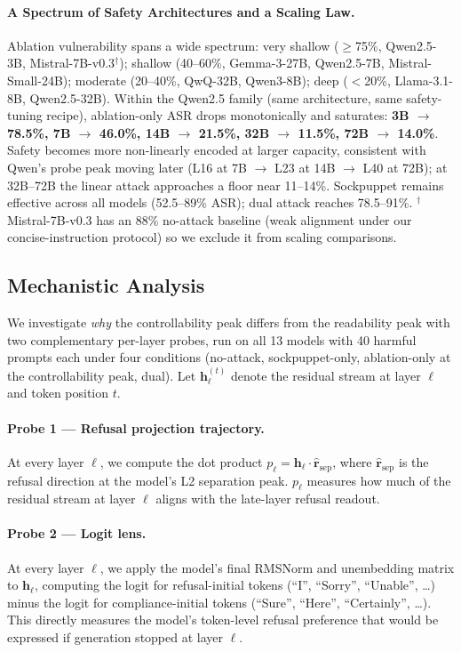 \documentclass{article}
\begin{document}
\paragraph{A Spectrum of Safety Architectures and a Scaling Law.}
Ablation vulnerability spans a wide spectrum: very shallow ($\geq$75\%, Qwen2.5-3B, Mistral-7B-v0.3$^\dagger$); shallow (40--60\%, Gemma-3-27B, Qwen2.5-7B, Mistral-Small-24B); moderate (20--40\%, QwQ-32B, Qwen3-8B); deep ($<$20\%, Llama-3.1-8B, Qwen2.5-32B). Within the Qwen2.5 family (same architecture, same safety-tuning recipe), ablation-only ASR drops monotonically and saturates: \textbf{3B $\to$ 78.5\%, 7B $\to$ 46.0\%, 14B $\to$ 21.5\%, 32B $\to$ 11.5\%, 72B $\to$ 14.0\%}. Safety becomes more non-linearly encoded at larger capacity, consistent with Qwen's probe peak moving later (L16 at 7B $\to$ L23 at 14B $\to$ L40 at 72B); at 32B--72B the linear attack approaches a floor near 11--14\%. Sockpuppet remains effective across all models (52.5--89\% ASR); dual attack reaches 78.5--91\%. $^\dagger$Mistral-7B-v0.3 has an 88\% no-attack baseline (weak alignment under our concise-instruction protocol) so we exclude it from scaling comparisons.

\subsection{Mechanistic Analysis}
\label{sec:mech}

We investigate \emph{why} the controllability peak differs from the readability peak with two complementary per-layer probes, run on all 13 models with 40 harmful prompts each under four conditions (no-attack, sockpuppet-only, ablation-only at the controllability peak, dual). Let $\mathbf{h}_\ell^{(t)}$ denote the residual stream at layer $\ell$ and token position $t$.

\paragraph{Probe 1 — Refusal projection trajectory.}
At every layer $\ell$, we compute the dot product $p_\ell = \mathbf{h}_\ell \cdot \hat{\mathbf{r}}_{\text{sep}}$, where $\hat{\mathbf{r}}_{\text{sep}}$ is the refusal direction at the model's L2 separation peak. $p_\ell$ measures how much of the residual stream at layer $\ell$ aligns with the late-layer refusal readout.

\paragraph{Probe 2 — Logit lens.}
At every layer $\ell$, we apply the model's final RMSNorm and unembedding matrix to $\mathbf{h}_\ell$, computing the logit for refusal-initial tokens (``I'', ``Sorry'', ``Unable'', \dots) minus the logit for compliance-initial tokens (``Sure'', ``Here'', ``Certainly'', \dots). This directly measures the model's token-level refusal preference that would be expressed if generation stopped at layer $\ell$.
\end{document}
